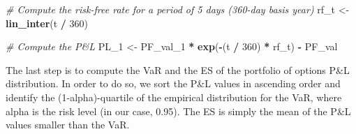 \documentclass[]{article}
\newenvironment{Shaded}{\begin{snugshade}}{\end{snugshade}}
\newcommand{\CommentTok}[1]{\textcolor[rgb]{0.56,0.35,0.01}{\textit{#1}}}
\newcommand{\DecValTok}[1]{\textcolor[rgb]{0.00,0.00,0.81}{#1}}
\newcommand{\KeywordTok}[1]{\textcolor[rgb]{0.13,0.29,0.53}{\textbf{#1}}}
\newcommand{\NormalTok}[1]{#1}
\newcommand{\OperatorTok}[1]{\textcolor[rgb]{0.81,0.36,0.00}{\textbf{#1}}}
\newcommand{\StringTok}[1]{\textcolor[rgb]{0.31,0.60,0.02}{#1}}
\begin{document}
\begin{Shaded}
\begin{Highlighting}[]
\CommentTok{\# Compute the risk{-}free rate for a period of 5 days (360{-}day basis year)}
\NormalTok{rf\_t <{-}}\StringTok{ }\KeywordTok{lin\_inter}\NormalTok{(t }\OperatorTok{/}\StringTok{ }\DecValTok{360}\NormalTok{)}

\CommentTok{\# Compute the P\&L}
\NormalTok{PL\_}\DecValTok{1}\NormalTok{ <{-}}\StringTok{ }\NormalTok{PF\_val\_}\DecValTok{1} \OperatorTok{*}\StringTok{ }\KeywordTok{exp}\NormalTok{(}\OperatorTok{{-}}\NormalTok{(t }\OperatorTok{/}\StringTok{ }\DecValTok{360}\NormalTok{) }\OperatorTok{*}\StringTok{ }\NormalTok{rf\_t) }\OperatorTok{{-}}\StringTok{ }\NormalTok{PF\_val}
\end{Highlighting}
\end{Shaded}

The last step is to compute the VaR and the ES of the portfolio of
options P\&L distribution. In order to do so, we sort the P\&L values in
ascending order and identify the (1-alpha)-quartile of the empirical
distribution for the VaR, where alpha is the risk level (in our case,
0.95). The ES is simply the mean of the P\&L values smaller than the
VaR.
\end{document}
